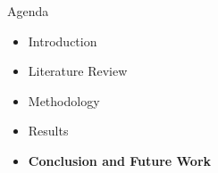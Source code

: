 \begin{frame}{Agenda}
\begin{itemize}
    \item Introduction
    \item Literature Review
    \item Methodology
    \item Results
    \item \textbf{Conclusion and Future Work}
\end{itemize}
\end{frame}